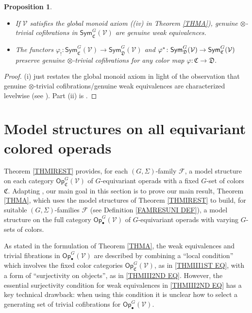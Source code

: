 \documentclass[a4paper,10pt
,draft
]{article}%
\numberwithin{equation}{section}
\numberwithin{figure}{section}
\newtheorem{proposition}[equation]{Proposition}%
\theoremstyle{definition} %
\newcommand{\F}{\ensuremath{\mathcal F}}
\newcommand{\V}{\ensuremath{\mathcal V}}
\newcommand{\C}{\ensuremath{\mathcal C}}
\newcommand{\1}{\ensuremath{\mathbbm 1}}%
\begin{document}
\begin{proposition}\label{GOTC_PROP}
	\begin{itemize}
		\item [(i)] 
		If $\V$ satisfies the global monoid axiom
		((iv) in Theorem \ref{THMA}),
		genuine $\otimes$-trivial cofibrations
		in $\mathsf{Sym}^G_{\mathfrak C}(\V)$
		are genuine weak equivalences.
		\item[(ii)]
		The functors
		$\varphi_! \colon 
		\mathsf{Sym}^G_{\mathfrak C}(\V)
		\to 
		\mathsf{Sym}^G_{\mathfrak D}(\V)$
		and
		$\varphi^{\**} \colon 
		\mathsf{Sym}^G_{\mathfrak D}(\V)
		\to 
		\mathsf{Sym}^G_{\mathfrak C}(\V)$
		preserve genuine $\otimes$-trivial cofibrations
		for any color map
		$\varphi \colon \mathfrak{C} \to \mathfrak{D}$.
	\end{itemize}
\end{proposition}

\begin{proof}
	(i) just restates the global monoid axiom
	\cite[Def. \ref{OC-GLOBMONAX_DEF}]{BP_FCOP} in light of the observation that genuine $\otimes$-trivial cofibrations/genuine weak equivalences 
	are characterized levelwise (see
	\cite[Rem. \ref{OC-SIGMACOF_REM}, Def. \ref{OC-GGENOTITC DEF}]{BP_FCOP}).
	Part (ii) is \cite[Prop. \ref{OC-REGEOTCOF PROP}]{BP_FCOP}.
\end{proof}





\section{Model structures on all equivariant colored operads
	}\label{MS_SEC}


\renewcommand{\C}{\mathfrak C}


Theorem \ref{THMIREST} provides,
for each $(G,\Sigma)$-family $\F$,
a model structure on each category
$\mathsf{Op}_{\mathfrak{C}}^G(\V)$
of $G$-equivariant operads with a fixed $G$-set of colors $\mathfrak{C}$.
Adapting \cite{BM13,Cav,CM13b},
our main goal in this section is 
to prove our main result, Theorem \ref{THMA},
which uses the model structures of Theorem \ref{THMIREST}
to build,
for suitable $(G,\Sigma)$-families $\F$ 
(see Definition \ref{FAMRESUNI DEF}),
a model structure on the full category $\mathsf{Op}^G_\bullet(\mathcal{V})$
of $G$-equivariant operads with varying $G$-sets of colors. 


As stated in the formulation of Theorem \ref{THMA},
the weak equivalences and trivial fibrations 
in $\mathsf{Op}^G_\bullet(\V)$
are described by combining
a ``local condition'' which involves the fixed color categories $\mathsf{Op}_{\mathfrak{C}}^G(\V)$,
as in \eqref{THMIII1ST EQ},
with a form of ``surjectivity on objects'',
as in \eqref{THMIII2ND EQ}.
However, the essential surjectivity condition for 
weak equivalences in \eqref{THMIII2ND EQ}
has a key technical drawback: 
when using this condition 
it is unclear how to select a generating set of trivial cofibrations 
for $\mathsf{Op}^G_\bullet(\V)$.
\end{document}
